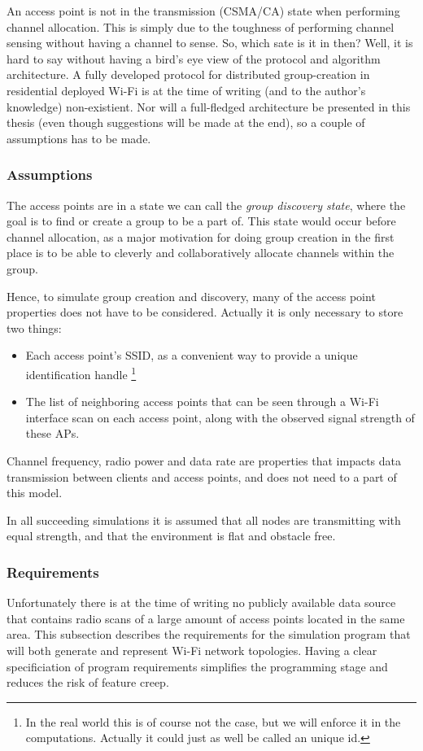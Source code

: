 An access point is not in the transmission (CSMA/CA) state when performing channel allocation. This is simply due to the toughness of performing channel sensing without
having a channel to sense. So, which sate is it in then? Well, it is hard to say without having a bird's eye view of the protocol and algorithm architecture. A fully developed protocol
for distributed group-creation in residential deployed Wi-Fi is at the time of writing (and to the author's knowledge) non-existient.  Nor will a full-fledged architecture be presented in
this thesis (even though suggestions will be made at the end), so a couple of assumptions has to be made. 

\subsubsection{Assumptions}
The access points are in a state we can call the \textit{group discovery state}, where the goal is to find or create a group to be a part of. This state would occur before channel
allocation, as a major motivation for doing group creation in the first place is to be able to cleverly and collaboratively allocate channels within the group. 

Hence, to simulate group creation and discovery, many of the access point properties does not have to be considered. Actually it is only necessary to store two things:
\begin{itemize}
	\item Each access point's SSID, as a convenient way to provide a unique identification handle \footnote{In the real world this is of course not the case,
but we will enforce it in the computations. Actually it could just as well be called an unique id.}
	\item The list of neighboring access points that can be seen through a Wi-Fi interface scan on each access point, along with the observed signal strength of these APs.
\end{itemize}
Channel frequency, radio power and data rate are properties that impacts data transmission between clients and access points, and does not need to a 
part of this model. 

In all succeeding simulations it is assumed that all nodes are transmitting with equal strength, and that the environment is flat and obstacle free. 

\subsubsection{Requirements}
Unfortunately there is at the time of writing no publicly available data source that contains radio scans of a large amount of access points located in the same area.
This subsection describes the requirements for the simulation program that will both generate and represent Wi-Fi network topologies. Having a clear specificiation of program requirements
simplifies the programming stage and reduces the risk of feature creep. 

